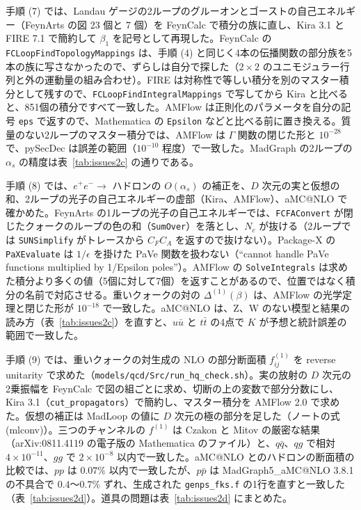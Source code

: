 \documentclass[a4paper,10pt]{ltjsarticle}
\begin{document}
手順 (7) では、Landau ゲージの2ループのグルーオンとゴーストの自己エネルギー（FeynArts の図 23 個と 7 個）を FeynCalc で積分の族に直し、Kira 3.1 と FIRE 7.1 で簡約して $\beta_1$ を記号として再現した。FeynCalc の \texttt{FCLoopFindTopologyMappings} は、手順 (4) と同じく4本の伝播関数の部分族を5本の族に写さなかったので、ずらしは自分で探した（$2\times2$ のユニモジュラー行列と外の運動量の組み合わせ）。FIRE は対称性で等しい積分を別のマスター積分として残すので、\texttt{FCLoopFindIntegralMappings} で写してから Kira と比べると、851個の積分ですべて一致した。AMFlow は正則化のパラメータを自分の記号 \texttt{eps} で返すので、Mathematica の \texttt{Epsilon} などと比べる前に置き換える。質量のない2ループのマスター積分では、AMFlow は $\Gamma$ 関数の閉じた形と $10^{-28}$ で、pySecDec は誤差の範囲（$10^{-10}$ 程度）で一致した。MadGraph の2ループの $\alpha_s$ の精度は表~\ref{tab:issues2c} の通りである。

手順 (8) では、$e^+e^-\to$ ハドロンの $O(\alpha_s)$ の補正を、$D$ 次元の実と仮想の和、2ループの光子の自己エネルギーの虚部（Kira、AMFlow）、aMC@NLO で確かめた。FeynArts の1ループの光子の自己エネルギーでは、\texttt{FCFAConvert} が閉じたクォークのループの色の和（\texttt{SumOver}）を落とし、$N_c$ が抜ける（2ループでは \texttt{SUNSimplify} がトレースから $C_FC_A$ を返すので抜けない）。Package-X の \texttt{PaXEvaluate} は $1/\epsilon$ を掛けた PaVe 関数を扱わない（``cannot handle PaVe functions multiplied by 1/Epsilon poles''）。AMFlow の \texttt{SolveIntegrals} は求めた積分より多くの値（5個に対して7個）を返すことがあるので、位置ではなく積分の名前で対応させる。重いクォークの対の $\Delta^{(1)}(\beta)$ は、AMFlow の光学定理と閉じた形が $10^{-18}$ で一致した。aMC@NLO は、Z、W のない模型と結果の読み方（表~\ref{tab:issues2c}）を直すと、$u\bar u$ と $t\bar t$ の4点で $K$ が予想と統計誤差の範囲で一致した。

手順 (9) では、重いクォークの対生成の NLO の部分断面積 $f^{(1)}_{ij}$ を reverse unitarity で求めた（\nolinkurl{models/qcd/Src/run_hq_check.sh}）。実の放射の $D$ 次元の2乗振幅を FeynCalc で図の組ごとに求め、切断の上の変数で部分分数にし、Kira 3.1（\texttt{cut\_propagators}）で簡約し、マスター積分を AMFlow 2.0 で求めた。仮想の補正は MadLoop の値に $D$ 次元の極の部分を足した（ノートの式 (mlconv)）。三つのチャンネルの $f^{(1)}$ は Czakon と Mitov の厳密な結果（arXiv:0811.4119 の電子版の Mathematica のファイル）と、$q\bar q$、$qg$ で相対 $4\times10^{-11}$、$gg$ で $2\times10^{-8}$ 以内で一致した。aMC@NLO とのハドロンの断面積の比較では、$pp$ は $0.07\%$ 以内で一致したが、$p\bar p$ は MadGraph5\_aMC@NLO 3.8.1 の不具合で $0.4$〜$0.7\%$ ずれ、生成された \texttt{genps\_fks.f} の1行を直すと一致した（表~\ref{tab:issues2d}）。道具の問題は表~\ref{tab:issues2d} にまとめた。
\end{document}
